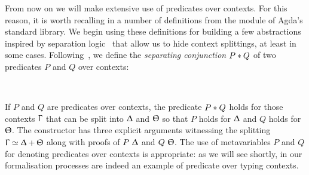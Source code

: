 From now on we will make extensive use of predicates over contexts. For this
reason, it is worth recalling in  a number of definitions
from the module  of Agda's standard library.
%
We begin using these definitions for building a few abstractions inspired by
separation logic~\cite{OHearnPym99} that allow us to hide context splittings, at
least in some cases.
%
Following~\citet{RouvoetPoulsenKrebbersVisser20}, we define the \emph{separating
conjunction} $P \mathbin\ast Q$ of two predicates $P$ and $Q$ over contexts:
\begin{code}%
\>[0]\AgdaSpace{}%
\AgdaSpace{}%
\AgdaSymbol{(}\AgdaSpace{}%
\AgdaSpace{}%
\AgdaSymbol{:}\AgdaSpace{}%
\AgdaSpace{}%
\AgdaSpace{}%
\AgdaSymbol{\AgdaUnderscore{})}\AgdaSpace{}%
\AgdaSymbol{(}\AgdaSpace{}%
\AgdaSymbol{:}\AgdaSpace{}%
\AgdaSymbol{)}\AgdaSpace{}%
\AgdaSymbol{:}\AgdaSpace{}%
\AgdaSpace{}%
\<%
\\
\>[0][@{}l@{\AgdaIndent{0}}]%
\>[2]\AgdaSpace{}%
\AgdaSymbol{:}\AgdaSpace{}%
\AgdaSpace{}%
\AgdaSymbol{\}}\AgdaSpace{}%
\AgdaSpace{}%
\AgdaSpace{}%
\AgdaSpace{}%
\AgdaSpace{}%
\AgdaSpace{}%
\AgdaSpace{}%
\AgdaSpace{}%
\AgdaOperator{\AgdaDatatype{+}}\AgdaSpace{}%
\AgdaSpace{}%
\AgdaSpace{}%
\AgdaSpace{}%
\AgdaSpace{}%
\AgdaSpace{}%
\AgdaSymbol{(}\AgdaSpace{}%
\AgdaSpace{}%
\AgdaSymbol{)}\AgdaSpace{}%
\<%
\end{code}

If $P$ and $Q$ are predicates over contexts, the predicate $P \mathbin\ast Q$ holds for
those contexts $\Upgamma$ that can be split into $\Updelta$ and $\Uptheta$ so
that $P$ holds for $\Updelta$ and $Q$ holds for $\Uptheta$.
%
The constructor  has three explicit arguments
witnessing the splitting $\Upgamma \simeq \Updelta + \Uptheta$ along with
proofs of $P~\Updelta$ and $Q~\Uptheta$.
%
The use of metavariables $P$ and $Q$ for denoting predicates over contexts is
appropriate: as we will see shortly, in our formalisation processes are indeed
an example of predicate over typing contexts.

